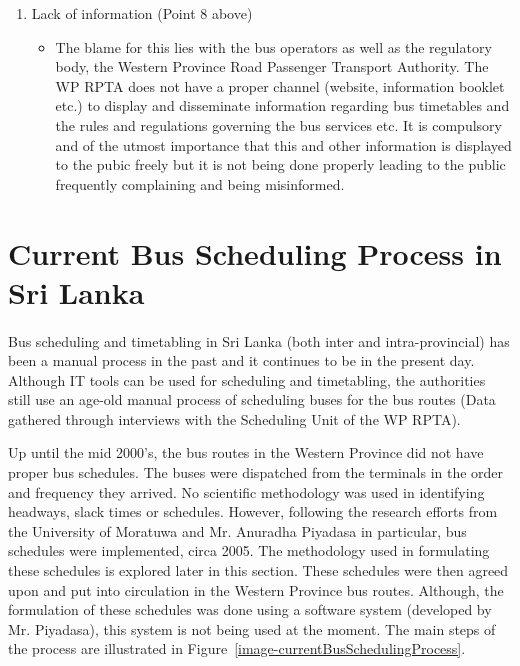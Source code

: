 \begin {enumerate}
\begin {itemize}
\end {itemize}
\item Lack of information (Point 8 above)
\begin {itemize}
\item The blame for this lies with the bus operators as well as the regulatory body, the Western Province Road Passenger Transport Authority. The WP RPTA does not have a proper channel (website, information booklet etc.) to display and disseminate information regarding bus timetables and the rules and regulations governing the bus services etc. It is compulsory and of the utmost importance that this and other information is displayed to the pubic freely but it is not being done properly leading to the public frequently complaining and being misinformed.
\end {itemize}
\end {enumerate}

\section{Current Bus Scheduling Process in Sri Lanka}
\label{section-CurrentBusSchedulingProcessInSriLanka}

\paragraph{ } Bus scheduling and timetabling in Sri Lanka (both inter and intra-provincial) has been a manual process in the past and it continues to be in the present day. Although IT tools can be used for scheduling and timetabling, the authorities still use an age-old manual process of scheduling buses for the bus routes (Data gathered through interviews with the Scheduling Unit of the WP RPTA).

Up until the mid 2000’s, the bus routes in the Western Province did not have proper bus schedules. The buses were dispatched from the terminals in the order and frequency they arrived. No scientific methodology was used in identifying headways, slack times or schedules. However, following the research efforts from the University of Moratuwa and Mr. Anuradha Piyadasa in particular, bus schedules were implemented, circa 2005. The methodology used in formulating these schedules is explored later in this section. These schedules were then agreed upon and put into circulation in the Western Province bus routes. Although, the formulation of these schedules was done using a software system (developed by Mr. Piyadasa), this system is not being used at the moment. The main steps of the process are illustrated in Figure~\ref{image-currentBusSchedulingProcess}.

